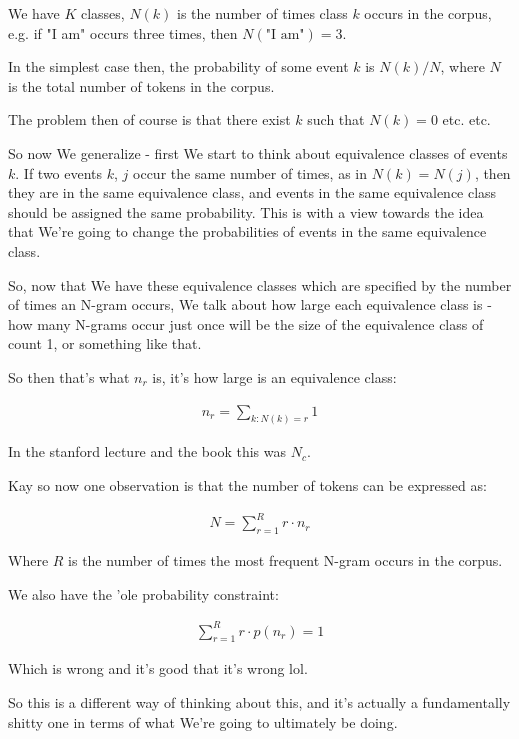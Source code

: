 \documentclass{article}
\begin{document}
			We have $K$ classes, $N(k)$ is the number of times class $k$ occurs in the corpus, e.g. if "I am" occurs three times, then $N(\text{"I am"}) = 3$.
			
			In the simplest case then, the probability of some event $k$ is $N(k)/N$, where $N$ is the total number of tokens in the corpus.
			
			The problem then of course is that there exist $k$ such that $N(k)=0$ etc. etc.
			
			So now We generalize - first We start to think about equivalence classes of events $k$. If two events $k$, $j$ occur the same number of times, as in $N(k)=N(j)$, then they are in the same equivalence class, and events in the same equivalence class should be assigned the same probability. This is with a view towards the idea that We're going to change the probabilities of events in the same equivalence class.
			
			So, now that We have these equivalence classes which are specified by the number of times an N-gram occurs, We talk about how large each equivalence class is - how many N-grams occur just once will be the size of the equivalence class of count 1, or something like that.
			
			So then that's what $n_r$ is, it's how large is an equivalence class:
			
			\begin{align}
				n_r = \sum_{k:N(k)=r}1
			\end{align}
			
			In the stanford lecture and the book this was $N_c$.
			
			Kay so now one observation is that the number of tokens can be expressed as:
			
			\begin{align}
				N = \sum^R_{r=1} r\cdot n_r
			\end{align}
			
			Where $R$ is the number of times the most frequent N-gram occurs in the corpus. 
			
			We also have the 'ole probability constraint:
			
			\begin{align}
				\sum^R_{r=1} r\cdot p(n_r) = 1
			\end{align}
			
			Which is wrong and it's good that it's wrong lol.
			
			So this is a different way of thinking about this, and it's actually a fundamentally shitty one in terms of what We're going to ultimately be doing.
			
\end{document}
